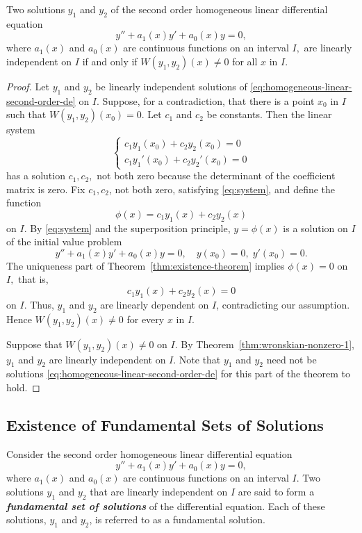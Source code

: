 \begin{theorem}\label{thm:wronskian-nonzero-2}
	 Two solutions \( y_1 \) and \( y_2 \)  of the second order  homogeneous linear  differential equation  
	\begin{equation}\label{eq:homogeneous-linear-second-order-de}
		y'' + a_1(x)y' + a_0(x)y = 0,
	\end{equation}
	where \( a_1(x) \) and \( a_0(x) \) are continuous functions on an interval $I,$ are linearly independent on $I$ if and only if $W(y_1, y_2)(x)\ne 0$ for all $x$ in $I.$
\end{theorem}
\begin{proof}
Let \(y_1\) and \(y_2\) be linearly independent solutions of \eqref{eq:homogeneous-linear-second-order-de} on \(I\). Suppose, for a contradiction, that there is a point $x_0$ in $I$ such that
	\(W(y_1,y_2)(x_0)= 0.\) Let  $c_1$ and $c_2$ be constants. Then the linear system
	\begin{equation}
		\begin{cases}\label{eq:system}
		c_1 y_1(x_0) + c_2 y_2(x_0) = 0\\
		c_1 y_1'(x_0) + c_2 y_2'(x_0) = 0
	\end{cases}
	\end{equation}
	has a solution \(c_1, c_2,\) not both zero because the determinant of the coefficient matrix is zero. Fix $c_1, c_2$, not both zero,  satisfying \eqref{eq:system}, and define  the function \[\phi(x) = c_1 y_1(x) + c_2 y_2(x)\] on $I.$ By \eqref{eq:system} and the superposition principle,  \( y = \phi(x)\) is a  solution on $I$  of the initial value problem
	\[y''+a_1(x) y' + a_0(x) y = 0, \quad y(x_0) = 0,\; y'(x_0) =0.\] The uniqueness part of Theorem~\ref{thm:existence-theorem} implies  \(\phi(x) =0\) on $I,$ that is,
	\[c_1 y_1(x) + c_2 y_2(x) = 0\] on $I.$ Thus, $y_1$ and $y_2$ are linearly dependent on $I$, contradicting our assumption. Hence  \(W(y_1,y_2)(x)\neq 0\) for every $x$ in $I.$

	
	Suppose that $W(y_1, y_2)(x)\ne 0$ on $I.$ By Theorem~\ref{thm:wronskian-nonzero-1}, \(y_1\) and \(y_2\) are linearly independent on \(I\). Note that \(y_1\) and \(y_2\) need not be solutions \eqref{eq:homogeneous-linear-second-order-de} for this part of the theorem to hold.
\end{proof}

\subsection{Existence of Fundamental Sets of Solutions}
\begin{definition}
Consider the second order  homogeneous linear  differential equation  
\[
y'' + a_1(x)y' + a_0(x)y = 0,
\]
where \( a_1(x) \) and \( a_0(x) \) are continuous functions on an interval $I.$  Two solutions $y_1$ and $y_2$  that are linearly independent on $I$ are said to form a \textbf{\textit{fundamental set of solutions}} of the differential equation. Each of these solutions, $y_1$ and $y_2$, is referred to as a fundamental solution.
\end{definition}

